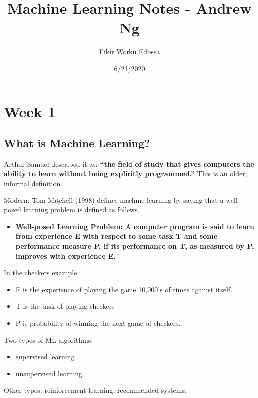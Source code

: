 \documentclass[
]{book}
\title{Machine Learning Notes - Andrew Ng}
\author{Fikir Worku Edossa}
\date{6/21/2020}
\providecommand{\tightlist}{%
  \setlength{\itemsep}{0pt}\setlength{\parskip}{0pt}}
\begin{document}
\maketitle

{
\setcounter{tocdepth}{1}
\tableofcontents
}
\hypertarget{week-1}{%
\chapter{Week 1}\label{week-1}}

\hypertarget{what-is-machine-learning}{%
\section{What is Machine Learning?}\label{what-is-machine-learning}}

Arthur Samuel described it as: \textbf{``the field of study that gives computers the ability to learn without being explicitly programmed.''}
This is an older, informal definition.

Modern: Tom Mitchell (1998) defines machine learning by saying that a well-posed learning problem is defined as follows.

\begin{itemize}
\tightlist
\item
  \textbf{Well-posed Learning Problem: A computer program is said to learn from experience E with respect to some task T and some performance measure P, if its performance on T, as measured by P, improves with experience E.}
\end{itemize}

In the checkers example

\begin{itemize}
\tightlist
\item
  E is the experience of playing the game 10,000's of times against itself.
\item
  T is the task of playing checkers
\item
  P is probability of winning the next game of checkers.
\end{itemize}

Two types of ML algorithms:

\begin{itemize}
\tightlist
\item
  supervised learning
\item
  unsupervised learning.
\end{itemize}

Other types: reinforcement learning, recommended systems.
\end{document}
